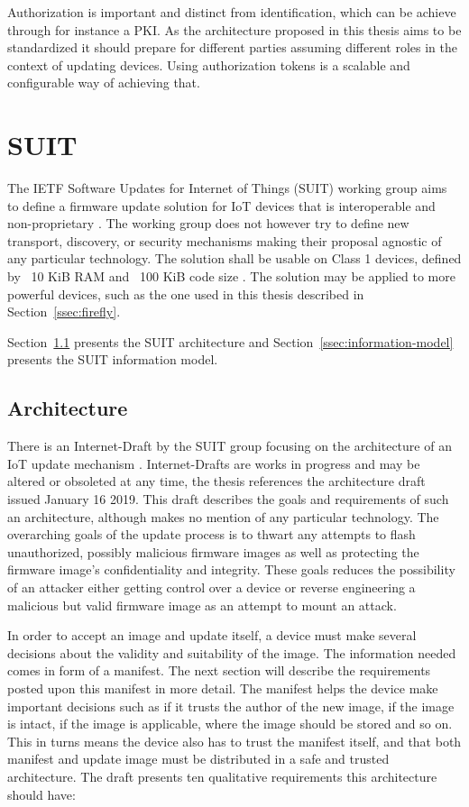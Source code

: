 \documentclass[0-thesis.tex]{subfiles}
\begin{document}
Authorization is important and distinct from identification, which can be achieve through
for instance a PKI. As the architecture proposed in this thesis aims to be standardized it
should prepare for different parties assuming different roles in the context of updating
devices. Using authorization tokens is a scalable and configurable way of achieving that.

\section{SUIT}
\label{sec:suit}
The IETF Software Updates for Internet of Things (SUIT) working group aims to define a
firmware update solution for IoT devices that is interoperable and non-proprietary
\parencite{suit}. The working group does not however try to define new transport,
discovery, or security mechanisms making their proposal agnostic of any particular
technology. The solution shall be usable on Class 1 devices, defined by ~10 KiB RAM and
~100 KiB code size \parencite{rfc7228}. The solution may be applied to more powerful
devices, such as the one used in this thesis described in Section~\ref{ssec:firefly}.

Section~\ref{ssec:architecture} presents the SUIT architecture and
Section~\ref{ssec:information-model} presents the SUIT information model.

\subsection{Architecture}
\label{ssec:architecture}
There is an Internet-Draft by the SUIT group focusing on the architecture of an IoT update
mechanism \parencite{suit-architecture}. Internet-Drafts are works in progress and may be
altered or obsoleted at any time, the thesis references the architecture draft issued
January 16 2019. This draft describes the goals and requirements of such an architecture,
although makes no mention of any particular technology. The overarching goals of the
update process is to thwart any attempts to flash unauthorized, possibly malicious
firmware images as well as protecting the firmware image's confidentiality and integrity.
These goals reduces the possibility of an attacker either getting control over a device or
reverse engineering a malicious but valid firmware image as an attempt to mount an attack.

In order to accept an image and update itself, a device must make several decisions about
the validity and suitability of the image. The information needed comes in form of a
manifest. The next section will describe the requirements posted upon this manifest in
more detail. The manifest helps the device make important decisions such as if it trusts
the author of the new image, if the image is intact, if the image is applicable, where the
image should be stored and so on. This in turns means the device also has to trust the
manifest itself, and that both manifest and update image must be distributed in a safe and
trusted architecture. The draft \parencite{suit-architecture} presents ten qualitative
requirements this architecture should have:
\end{document}
